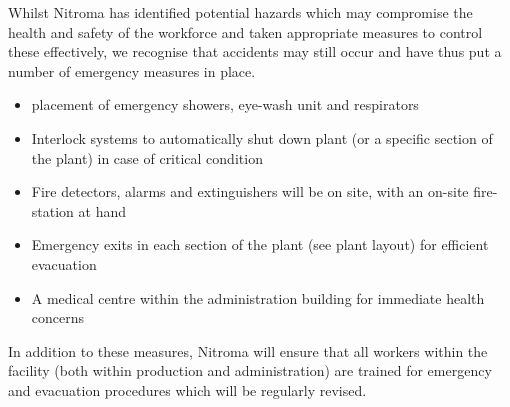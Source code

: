 Whilst Nitroma has identified potential hazards which may compromise the health and safety of the workforce and taken appropriate measures to control these effectively, we recognise that accidents may still occur and have thus put a number of emergency measures in place. 

 
\begin{itemize}
    \item placement of emergency showers, eye-wash unit and respirators
\item Interlock systems to automatically shut down plant (or a specific section of the plant) in case of critical condition %
\item Fire detectors, alarms and extinguishers will be on site, with an on-site fire-station at hand
    \item Emergency exits in each section of the plant (see plant layout) for efficient evacuation 
\item  A medical centre within the administration building for immediate health concerns
\end{itemize}

In addition to these measures, Nitroma will ensure that all workers within the facility (both within production and administration) are trained for emergency and evacuation procedures which will be regularly revised. 














 